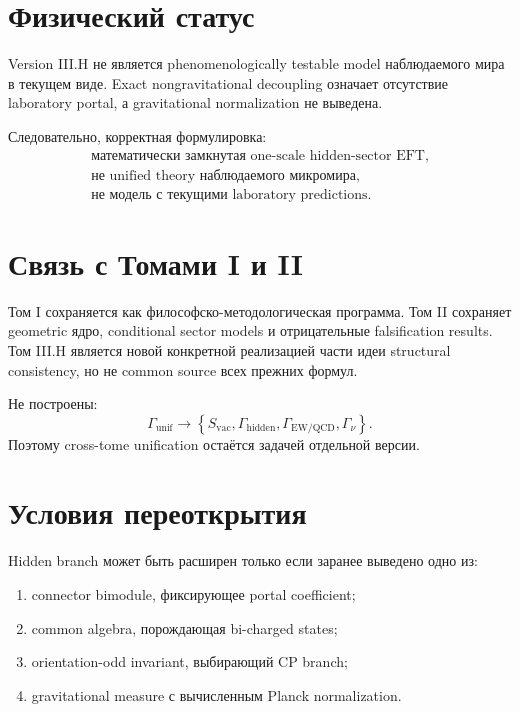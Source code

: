 \section{Физический статус}

\begin{theorem}
Version III.H не является phenomenologically testable model наблюдаемого
мира в текущем виде. Exact nongravitational decoupling означает отсутствие
laboratory portal, а gravitational normalization не выведена.
\end{theorem}

Следовательно, корректная формулировка:
\begin{equation}
 \boxed{
 \begin{gathered}
 \text{математически замкнутая one-scale hidden-sector EFT},\\
 \text{не unified theory наблюдаемого микромира},\\
 \text{не модель с текущими laboratory predictions}.
 \end{gathered}}
\end{equation}

\section{Связь с Томами I и II}

Том I сохраняется как философско-методологическая программа. Том II
сохраняет geometric ядро, conditional sector models и отрицательные
falsification results. Том III.H является новой конкретной реализацией
части идеи structural consistency, но не common source всех прежних
формул.

Не построены:
\begin{equation}
 \Gamma_{\mathrm{unif}}
 \longrightarrow
 \left\{
 S_{\mathrm{vac}},
 \Gamma_{\mathrm{hidden}},
 \Gamma_{\mathrm{EW/QCD}},
 \Gamma_\nu
 \right\}.
\end{equation}
Поэтому cross-tome unification остаётся задачей отдельной версии.

\section{Условия переоткрытия}

Hidden branch может быть расширен только если заранее выведено одно из:
\begin{enumerate}
 \item connector bimodule, фиксирующее portal coefficient;
 \item common algebra, порождающая bi-charged states;
 \item orientation-odd invariant, выбирающий CP branch;
 \item gravitational measure с вычисленным Planck normalization.
\end{enumerate}

